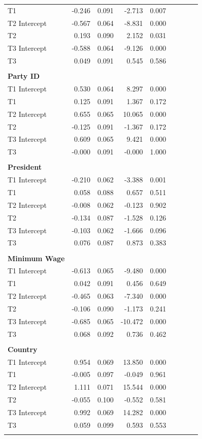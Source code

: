 \documentclass[12pt,econ]{sources/authesis}
\begin{document}
\begin{longtable}{lr@{}lr@{}lr@{}lr@{}l}
 T1 & -0.246 & 0.091 & -2.713 & 0.007 \\
 T2 Intercept & -0.567 & 0.064 & -8.831 & 0.000 \\
 T2 & 0.193 & 0.090 & 2.152 & 0.031 \\
 T3 Intercept & -0.588 & 0.064 & -9.126 & 0.000 \\ 
 T3 & 0.049 & 0.091 & 0.545 & 0.586 \\ 
 & & & & \\  
  \textbf{Party ID} & & & & \\  
 T1 Intercept & 0.530 & 0.064 & 8.297 & 0.000 \\
 T1 & 0.125 & 0.091 & 1.367 & 0.172 \\
 T2 Intercept & 0.655 & 0.065 & 10.065 & 0.000 \\
 T2 & -0.125 & 0.091 & -1.367 & 0.172 \\
 T3 Intercept & 0.609 & 0.065 & 9.421 & 0.000 \\ 
 T3 & -0.000 & 0.091 & -0.000 & 1.000 \\ 
 & & & & \\  
\textbf{President} & & & & \\  
 T1 Intercept & -0.210 & 0.062 & -3.388 & 0.001 \\ 
 T1 & 0.058 & 0.088 & 0.657 & 0.511 \\ 
 T2 Intercept & -0.008 & 0.062 & -0.123 & 0.902 \\ 
 T2 & -0.134 & 0.087 & -1.528 & 0.126 \\ 
 T3 Intercept & -0.103 & 0.062 & -1.666 & 0.096 \\
 T3 & 0.076 & 0.087 & 0.873 & 0.383 \\ 
 & & & & \\  
\textbf{Minimum Wage} & & & & \\  
 T1 Intercept & -0.613 & 0.065 & -9.480 & 0.000 \\ 
 T1 & 0.042 & 0.091 & 0.456 & 0.649 \\ 
 T2 Intercept & -0.465 & 0.063 & -7.340 & 0.000 \\
 T2 & -0.106 & 0.090 & -1.173 & 0.241 \\
 T3 Intercept & -0.685 & 0.065 & -10.472 & 0.000 \\ 
 T3 & 0.068 & 0.092 & 0.736 & 0.462 \\
 & & & & \\  
\textbf{Country} & & & & \\  
 T1 Intercept & 0.954 & 0.069 & 13.850 & 0.000 \\ 
 T1 & -0.005 & 0.097 & -0.049 & 0.961 \\ 
 T2 Intercept & 1.111 & 0.071 & 15.544 & 0.000 \\ 
 T2 & -0.055 & 0.100 & -0.552 & 0.581 \\ 
 T3 Intercept & 0.992 & 0.069 & 14.282 & 0.000 \\
 T3 & 0.059 & 0.099 & 0.593 & 0.553 \\ 
 \hline \\[-1.8ex]
 \end{longtable}
\dsp
\end{document}
